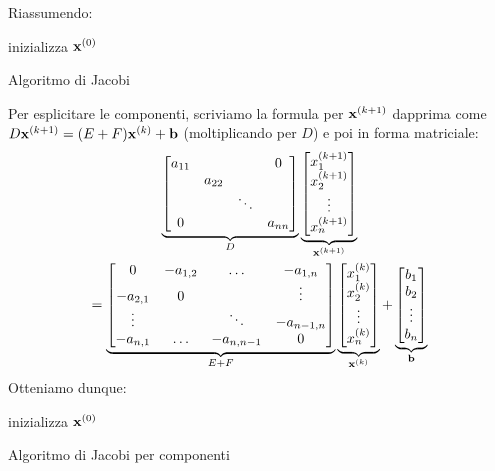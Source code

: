 Riassumendo: \\
\begin{algo}
	inizializza $\mathbf{x}^{(0)}$\;
	\caption{Algoritmo di Jacobi}
\end{algo}
Per esplicitare le componenti, scriviamo la formula per $\mathbf{x}^{( k+1)}$ dapprima come $D\mathbf{x}^{( k+1)} =( E+F)\mathbf{x}^{(k)} +\mathbf{b}$ (moltiplicando per $D$) e poi in forma matriciale:
\begin{gather*}
\underbrace{\begin{bmatrix}
a_{11} &  &  & 0\\
 & a_{22} &  & \\
 &  & \ddots  & \\
0 &  &  & a_{nn}
\end{bmatrix}}_{D}\underbrace{\begin{bmatrix}
x^{( k+1)}_{1}\\
x^{( k+1)}_{2}\\
\vdots \\
x^{( k+1)}_{n}
\end{bmatrix}}_{\mathbf{x}^{( k+1)}} \\
=
\underbrace{\begin{bmatrix}
0 & -a_{1,2} & \dotsc  & -a_{1,n}\\
-a_{2,1} & 0 &  & \vdots \\
\vdots  &  & \ddots  & -a_{n-1,n}\\
-a_{n,1} & \dotsc  & -a_{n,n-1} & 0
\end{bmatrix}}_{E+F}\underbrace{\begin{bmatrix}
x^{(k)}_{1}\\
x^{(k)}_{2}\\
\vdots \\
x^{(k)}_{n}
\end{bmatrix}}_{\mathbf{x}^{(k)}} +\underbrace{\begin{bmatrix}
b_{1}\\
b_{2}\\
\vdots \\
b_{n}
\end{bmatrix}}_{\mathbf{b}}
\end{gather*}
Otteniamo dunque: \\
\begin{algo}
	inizializza $\mathbf{x}^{(0)}$\;
	\caption{Algoritmo di Jacobi per componenti}
\end{algo}
